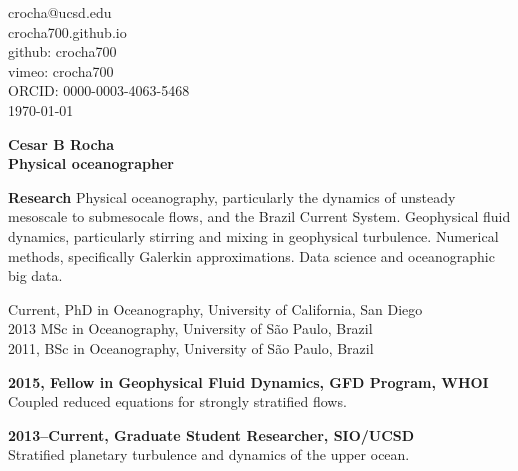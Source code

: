 \documentclass[a4paper,11pt,final]{memoir}
\newcommand{\Sep}{\vspace{1.25em}}
\newcommand{\SmallSep}{\vspace{0.5em}}
\newenvironment{Research}
    {\ignorespaces\textbf{\color{NavyBlue} Research}}
\newcommand{\CVSection}[1]
    {\Large\textbf{#1}\par
    \SmallSep\normalsize\normalfont}
\newcommand{\CVItem}[1]
    {\textbf{\color{NavyBlue} #1}}
\begin{document}
%

\begin{flushright}\small
    crocha@ucsd.edu\\[.1cm]
    crocha700.github.io\\[.1cm]
    github: crocha700\\[.1cm]
    vimeo: crocha700\\[.1cm]
    ORCID: 0000-0003-4063-5468\\[.1cm] 
    \textcolor[gray]{0.45}{\mydate\today}\\[.1cm]
\end{flushright}\normalsize
\framebreak

\Huge\bfseries { \color{NavyBlue}  Cesar B Rocha} \\
\Large\bfseries Physical oceanographer \\

\normalsize\normalfont

\begin{Research}
Physical oceanography, particularly the dynamics of unsteady
mesoscale to submesocale flows, and the Brazil Current System. 
Geophysical fluid dynamics, particularly stirring and mixing in geophysical turbulence.  
Numerical methods, specifically Galerkin approximations.
Data science and oceanographic big data.
\end{Research}

\Sep


Current, PhD in Oceanography, University of California, San Diego \\
2013 MSc in Oceanography, University of S\~ao Paulo, Brazil \\
2011, BSc in Oceanography, University of S\~ao Paulo, Brazil

\Sep


\CVItem{2015, Fellow in Geophysical Fluid Dynamics, GFD Program, WHOI}\\
Coupled reduced equations for strongly stratified flows.
\SmallSep

\CVItem{2013--Current, Graduate Student Researcher, SIO/UCSD}\\
Stratified planetary turbulence and dynamics of the upper ocean.
\SmallSep
\end{document}
